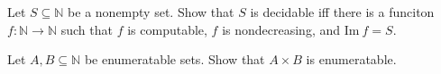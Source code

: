 \documentclass[addpoints]{exam}
\begin{document}
  \pagestyle{headandfoot}
  \runningheadrule

  \firstpagefooter{}{}{}
  \runningfooter{}{}{}
  \begin{flushright}

    \vspace{0.2in}
  \end{flushright}

  \begin{questions}
    \question[10]
      Let $S \subseteq \mathbb{N}$ be a nonempty set.
			Show that $S$ is decidable iff there is a funciton $f : \mathbb{N} \to
			\mathbb{N}$ such that $f$ is computable, $f$ is nondecreasing, and 
			$\mathrm{Im}~f = S$.

      \begin{solution}[\stretch{1}]
      \end{solution}
      \newpage
    \question[10]
      Let $A, B \subseteq \mathbb{N}$ be enumeratable sets.
			Show that $A \times B$ is enumeratable.

      \begin{solution}[\stretch{1}]
      \end{solution}
      \newpage
  \end{questions}
\end{document}
